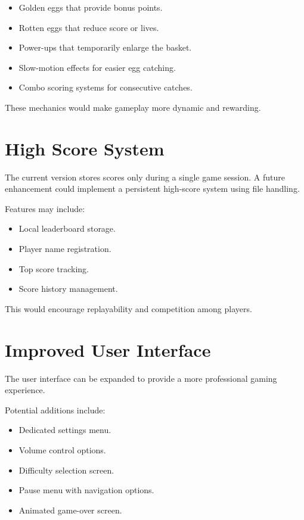 \documentclass[12pt,a4paper]{report}
\begin{document}
\begin{itemize}
    \item Golden eggs that provide bonus points.
    \item Rotten eggs that reduce score or lives.
    \item Power-ups that temporarily enlarge the basket.
    \item Slow-motion effects for easier egg catching.
    \item Combo scoring systems for consecutive catches.
\end{itemize}

These mechanics would make gameplay more dynamic and rewarding.

\section{High Score System}

The current version stores scores only during a single game session.
A future enhancement could implement a persistent high-score system using file handling.

Features may include:

\begin{itemize}
    \item Local leaderboard storage.
    \item Player name registration.
    \item Top score tracking.
    \item Score history management.
\end{itemize}

This would encourage replayability and competition among players.

\section{Improved User Interface}

The user interface can be expanded to provide a more professional gaming experience.

Potential additions include:

\begin{itemize}
    \item Dedicated settings menu.
    \item Volume control options.
    \item Difficulty selection screen.
    \item Pause menu with navigation options.
    \item Animated game-over screen.
\end{itemize}
\end{document}
